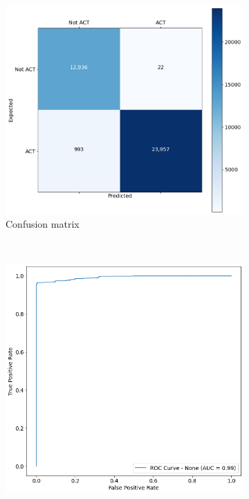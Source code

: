 \begin{figure}[H]
	\begin{subfigure}{\textwidth}
		\centering
		\includegraphics[scale=0.3]{./src/actAlerts/actalerts_adasyn_cm.png}
		\caption{Confusion matrix}\label{}
	\end{subfigure}\\
	\begin{subfigure}{.5\textwidth}
		\centering
		\includegraphics[scale=0.3]{./src/actAlerts/actalerts_adasyn_roc.png}

\end{subfigure}
\end{figure}
